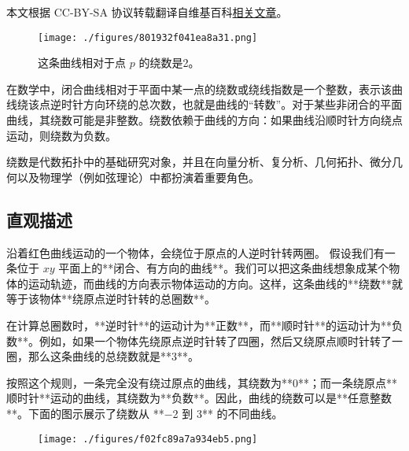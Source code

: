 
本文根据 CC-BY-SA 协议转载翻译自维基百科\href{https://en.wikipedia.org/wiki/Winding_number}{相关文章}。

\begin{figure}[ht]
\centering
\texttt{[image: ./figures/801932f041ea8a31.png]}
\caption{这条曲线相对于点 $p$ 的绕数是2。} \label{fig_JRS_1}
\end{figure}
在数学中，闭合曲线相对于平面中某一点的绕数或绕线指数是一个整数，表示该曲线绕该点逆时针方向环绕的总次数，也就是曲线的“转数”。对于某些非闭合的平面曲线，其绕数可能是非整数。绕数依赖于曲线的方向：如果曲线沿顺时针方向绕点运动，则绕数为负数。

绕数是代数拓扑中的基础研究对象，并且在向量分析、复分析、几何拓扑、微分几何以及物理学（例如弦理论）中都扮演着重要角色。
\subsection{直观描述}
沿着红色曲线运动的一个物体，会绕位于原点的人逆时针转两圈。
假设我们有一条位于 $xy$ 平面上的**闭合、有方向的曲线**。我们可以把这条曲线想象成某个物体的运动轨迹，而曲线的方向表示物体运动的方向。这样，这条曲线的**绕数**就等于该物体**绕原点逆时针转的总圈数**。

在计算总圈数时，**逆时针**的运动计为**正数**，而**顺时针**的运动计为**负数**。例如，如果一个物体先绕原点逆时针转了四圈，然后又绕原点顺时针转了一圈，那么这条曲线的总绕数就是**3**。

按照这个规则，一条完全没有绕过原点的曲线，其绕数为**0**；而一条绕原点**顺时针**运动的曲线，其绕数为**负数**。因此，曲线的绕数可以是**任意整数**。下面的图示展示了绕数从 **−2 到 3** 的不同曲线。
\begin{figure}[ht]
\centering
\texttt{[image: ./figures/f02fc89a7a934eb5.png]}
\caption{} \label{fig_JRS_2}
\end{figure}